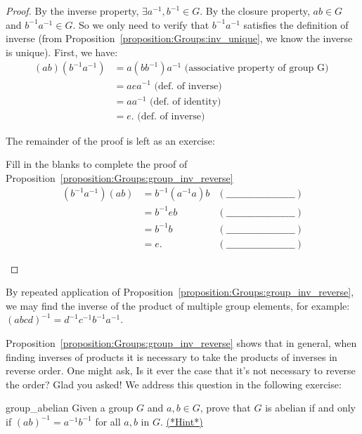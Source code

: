 \begin{proof}
By the inverse property, $ \exists a^{-1}, b^{-1} \in G$. By the closure property, $ab \in G$ and $b^{-1}a^{-1} \in G$. So
we only need to verify that $b^{-1}a^{-1}$ satisfies the definition of inverse (from Proposition~\ref{proposition:Groups:inv_unique}, we know the inverse is unique). First, we have:    
\begin{align*}
(ab)(b^{-1}a^{-1}) & = a(bb^{-1})a^{-1}  \text{ (associative property of group G) } \\
 & = aea^{-1}  \text{ (def. of inverse) } \\
 & = aa^{-1}  \text{ (def. of identity) } \\
 & = e.  \text{ (def. of inverse) }
\end{align*}

\noindent
The remainder of the proof is left as an exercise:

\begin{exercise}{42}
Fill in the blanks to complete the proof of Proposition~\ref{proposition:Groups:group_inv_reverse}
\begin{align*}
(b^{-1}a^{-1})(ab) & = b^{-1}(a^{-1}a)b  &(\_\_\_\_\_\_\_\_\_\_\_\_\_\_\_\_\_\_\_\_\_) \\
 & = b^{-1}eb  &(\_\_\_\_\_\_\_\_\_\_\_\_\_\_\_\_\_\_\_\_\_) \\
 & = b^{-1}b  &(\_\_\_\_\_\_\_\_\_\_\_\_\_\_\_\_\_\_\_\_\_) \\
 & = e.  &(\_\_\_\_\_\_\_\_\_\_\_\_\_\_\_\_\_\_\_\_\_)
\end{align*}
\end{exercise}
\end{proof}

By repeated application of Proposition~\ref{proposition:Groups:group_inv_reverse}, we may find the inverse of the product of multiple group elements, for example: $(abcd)^{-1} = d^{-1}c^{-1}b^{-1}a^{-1}$.

Proposition~\ref{proposition:Groups:group_inv_reverse} shows that in general, when finding inverses of products it is necessary to take the products of inverses in reverse order. One might ask, Is it ever the case that it's not necessary to reverse the order? Glad you asked! We address this question in the following exercise: 

\begin{exercise}{group_abelian}
Given a group $G$ and $a, b \in G$, prove that $G$ is abelian if and only if $(ab)^{-1} =a^{-1}b^{-1}$ for all $a,b$ in $G$.
\hyperref[sec:Groups:Hints]{(*Hint*)} 
\end{exercise}
 

